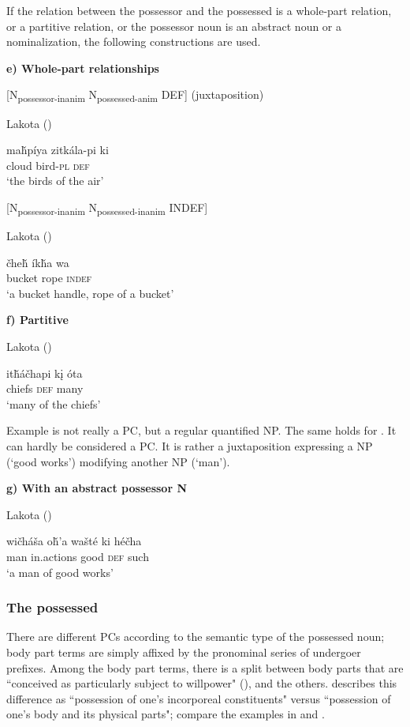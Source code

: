 \documentclass[output=paper]{LSP/langsci}
\begin{document}
If the relation between the possessor and the possessed is a whole-part relation, or a partitive relation, or the possessor noun is an abstract noun or a nominalization, the following constructions are used. 

\vspace{1em}
\textbf{e)	Whole-part relationships}

[N\textsubscript{possessor-inanim} N\textsubscript{possessed-anim} DEF] (juxtaposition)

\ea Lakota (\citealt[92]{Buechel1939})

\gll ma\v{h}píya zitkála-pi  ki  \\
cloud      bird-\textsc{pl} \textsc{def} \\
\glt `the birds of the air'
\z

[N\textsubscript{possessor-inanim} N\textsubscript{possessed-inanim} INDEF] 

\ea Lakota (\citealt[92]{Buechel1939})

\gll  \v{c}he\v{h} \'ik\v{h}a wa \\  
bucket rope \textsc{indef} \\
\glt `a bucket handle, rope of a bucket' 
\z 

\textbf{f)	Partitive}

\ea Lakota (\citealt[93]{Buechel1939}) \label{lakotamanychiefs}

\gll it\v{h}\'a\v{c}hapi k\k{i} \'ota \\
chiefs \textsc{def} many \\
\glt `many of the chiefs'
\z

Example  is not really a PC, but a regular quantified NP. The same holds for . It can hardly be considered a PC. It is rather a juxtaposition expressing a NP (`good works') modifying another NP (`man').

\vspace{1em}

\textbf{g)	With an abstract possessor N}

\ea Lakota (\citealt[93]{Buechel1939}) \label{lakotagoodworks}

\gll wi\v{c}háša o\v{h}'a     wašté ki     hé\v{c}ha \\
man       in.actions good  \textsc{def} such \\
\glt `a man of good works'
\z

\subsubsection{The possessed}
There are different PCs according to the semantic type of the possessed noun; body part terms are simply affixed by the pronominal series of undergoer prefixes. Among the body part terms, there is a split between body parts that are ``conceived as particularly subject to willpower" (\citealt[128]{BoasDeloria1941}), and the others. \citet[100]{Buechel1939} describes this difference as ``possession of one's incorporeal constituents" versus ``possession of one's body and its physical parts"; compare the examples in  and .
\end{document}
